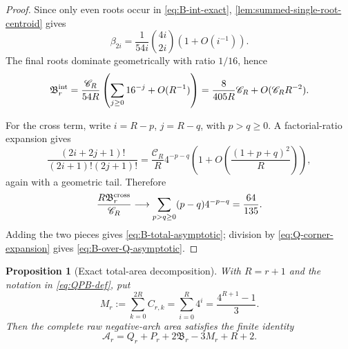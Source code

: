 \documentclass[11pt]{article}
\newtheorem{proposition}[theorem]{Proposition}
\theoremstyle{definition}
\theoremstyle{remark}
\begin{document}
\begin{proof}
Since only even roots occur in \eqref{eq:B-int-exact},
\cref{lem:summed-single-root-centroid} gives
\[
 \beta_{2i}
 =\frac{1}{54i}\binom{4i}{2i}
 \left(1+O(i^{-1})\right).
\]
The final roots dominate geometrically with ratio \(1/16\), hence
\[
 \mathfrak B_r^{\rm int}
 =\frac{\mathscr C_R}{54R}
 \left(\sum_{j\ge0}16^{-j}+O(R^{-1})\right)
 =\frac{8}{405R}\mathscr C_R
 +O(\mathscr C_RR^{-2}).
\]

For the cross term, write \(i=R-p\), \(j=R-q\), with \(p>q\ge0\).  A
factorial-ratio expansion gives
\[
 \frac{(2i+2j+1)!}{(2i+1)!(2j+1)!}
 =\frac{\mathscr C_R}{R}
 4^{-p-q}
 \left(1+O\!\left(\frac{(1+p+q)^2}{R}\right)\right),
\]
again with a geometric tail.  Therefore
\[
 \frac{R\mathfrak B_r^{\rm cross}}{\mathscr C_R}
 \longrightarrow
 \sum_{p>q\ge0}(p-q)4^{-p-q}
 =\frac{64}{135}.
\]
Adding the two pieces gives \eqref{eq:B-total-asymptotic}; division by
\eqref{eq:Q-corner-expansion} gives \eqref{eq:B-over-Q-asymptotic}.
\end{proof}

\begin{proposition}[Exact total-area decomposition]
\label{prop:exact-total-area-decomposition}
With \(R=r+1\) and the notation in \eqref{eq:QPB-def}, put
\begin{equation}
 M_r:=\sum_{k=0}^{2R}C_{r,k}
 =\sum_{i=0}^{R}4^i
 =\frac{4^{R+1}-1}{3}.
 \label{eq:Mr-layer-mass}
\end{equation}
Then the complete raw negative-arch area satisfies the finite identity
\begin{equation}
 {
 \mathcal A_r
 =Q_r+P_r+2\mathfrak B_r-3M_r+R+2.}
 \label{eq:A-QPB-exact}
\end{equation}
\end{proposition}
\end{document}
